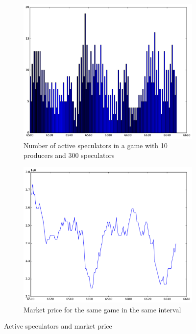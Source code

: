 \begin{figure}[h]
\begin{center}
	\begin{subfigure}[b]{0.5\textwidth}
	\includegraphics[scale=0.4]{images/minority/active_speculators_np10_ns300.pdf}
	\caption{Number of active speculators in a game with 10 producers and 300 speculators}
	\end{subfigure}
	\begin{subfigure}[b]{0.5\textwidth}
	\includegraphics[scale=0.4]{images/minority/market_price_np10_ns300.pdf}
	\caption{Market price for the same game in the same interval}
	\end{subfigure}
\caption{Active speculators and market price}
\label{fig:active speculators}
\end{center}
\end{figure}